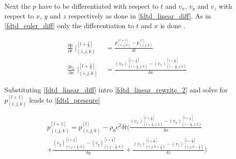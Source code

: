Next the $p$ have to be differentiated with respect to $t$ and $v_x$, $v_y$ and $v_z$ with respect to $x$, $y$ and $z$ respectively as done in \autoref{fdtd_linear_diff}. As in \autoref{fdtd_euler_diff} only the differentiation to $t$ and $x$ is done \citep{Sakuma2014}.



\begin{subequations}\label{fdtd_linear_diff}
\begin{alignat}{2}
\frac{\partial p}{\partial t}\mid _{(i,j,k)}^{[l+\frac{1}{2}]} &= \frac{p_{(i,j,k)}^{[l+1]} -p_{(i,j,k)}^{[l]}}{\delta t} \label{fdtd_linear_diff_1}\\
\frac{\partial v_x}{\partial x}\mid _{(i,j,k)}^{[l+\frac{1}{2}]} &= \frac{(v_x)_{(i+\frac{1}{2},j,k)}^{[l+\frac{1}{2}]} -(v_x)_{(i-\frac{1}{2},j,k)}^{[l+\frac{1}{2}]}}{\delta x} \label{fdtd_euler_diff_2}
\end{alignat}
\end{subequations}


Substituting \autoref{fdtd_linear_diff} intro \autoref{fdtd_linear_rewrite_2} and solve for $p_{(i,j,k)}^{[l+1]}$ leads to  \autoref{fdtd_pressure}




\begin{multline}\label{fdtd_pressure}
p_{(i,j,k)}^{[l+1]} = p_{(i,j,k)}^{[l]} - \rho_0 c^2 \delta t \Biggl( \frac{(v_x)_{(i+\frac{1}{2},j,k)}^{[l+\frac{1}{2}]} - (v_x)_{(i-\frac{1}{2},j,k)}^{[l+\frac{1}{2}]}}{\delta x} \\ 
+ \frac{(v_y)_{(i,j+\frac{1}{2},k)}^{[l+\frac{1}{2}]}-(v_y)_{(i,j-\frac{1}{2},k)}^{[l+\frac{1}{2}]}}{\delta y} +  \frac{(v_z)_{(i,j,k+\frac{1}{2})}^{[l+\frac{1}{2}]}-(v_z)_{(i,j,k-\frac{1}{2})}^{[l+\frac{1}{2}]}}{\delta z} \Biggr)
\end{multline}

